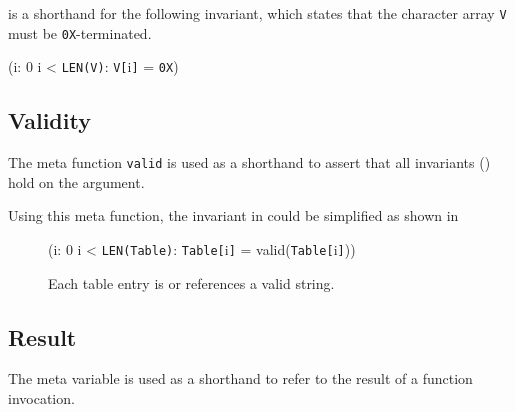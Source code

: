 \asciiz is a shorthand for the following invariant, which states that
the character array \texttt{V} must be \texttt{0X}-terminated.

\begin{invariant}
(\exists i: 0 \leq i < \texttt{LEN(V)}: \texttt{V[}i\texttt{]} = \texttt{0X})
\end{invariant}

\subsection{Validity}

The meta function \texttt{valid} is used as a shorthand to assert that
all invariants () hold on the argument.

Using this meta function, the invariant in  could
be simplified as shown in 

\begin{figure}[h]
  \begin{invariant}
    (\forall i: 0 \leq i < \texttt{LEN(Table)}:
    \texttt{Table[}i\texttt{]} = \nil \logicalor valid(\texttt{Table[}i\texttt{]\deref}))
  \end{invariant}
  \caption{Each table entry is \nil or references a valid string.}\label{fig:intro:valid}
\end{figure}


\subsection{Result}

The meta variable \result{} is used as a shorthand to refer to the
result of a function invocation.
